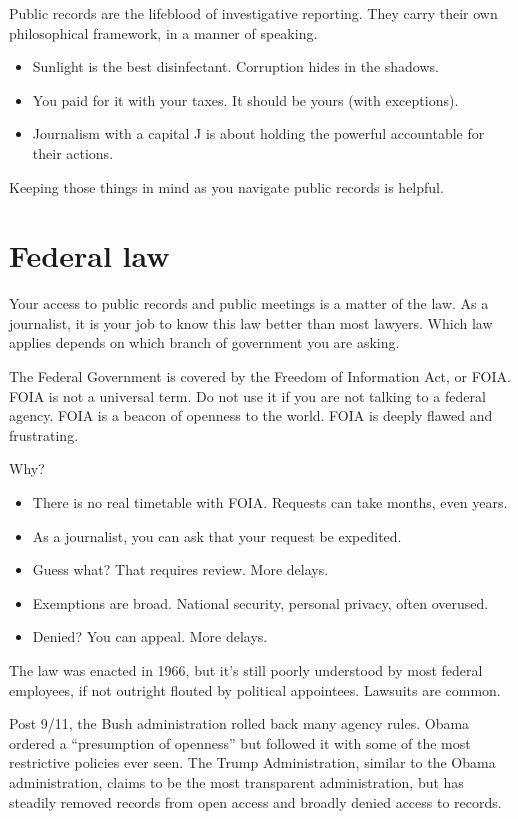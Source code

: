 \documentclass[]{book}
\providecommand{\tightlist}{%
  \setlength{\itemsep}{0pt}\setlength{\parskip}{0pt}}
\begin{document}
Public records are the lifeblood of investigative reporting. They carry their own philosophical framework, in a manner of speaking.

\begin{itemize}
\tightlist
\item
  Sunlight is the best disinfectant. Corruption hides in the shadows.
\item
  You paid for it with your taxes. It should be yours (with exceptions).
\item
  Journalism with a capital J is about holding the powerful accountable for their actions.
\end{itemize}

Keeping those things in mind as you navigate public records is helpful.

\hypertarget{federal-law}{%
\section{Federal law}\label{federal-law}}

Your access to public records and public meetings is a matter of the law. As a journalist, it is your job to know this law better than most lawyers. Which law applies depends on which branch of government you are asking.

The Federal Government is covered by the Freedom of Information Act, or FOIA. FOIA is not a universal term. Do not use it if you are not talking to a federal agency. FOIA is a beacon of openness to the world. FOIA is deeply flawed and frustrating.

Why?

\begin{itemize}
\tightlist
\item
  There is no real timetable with FOIA. Requests can take months, even years.
\item
  As a journalist, you can ask that your request be expedited.
\item
  Guess what? That requires review. More delays.
\item
  Exemptions are broad. National security, personal privacy, often overused.
\item
  Denied? You can appeal. More delays.
\end{itemize}

The law was enacted in 1966, but it's still poorly understood by most federal employees, if not outright flouted by political appointees. Lawsuits are common.

Post 9/11, the Bush administration rolled back many agency rules. Obama ordered a ``presumption of openness'' but followed it with some of the most restrictive policies ever seen. The Trump Administration, similar to the Obama administration, claims to be the most transparent administration, but has steadily removed records from open access and broadly denied access to records.
\end{document}
